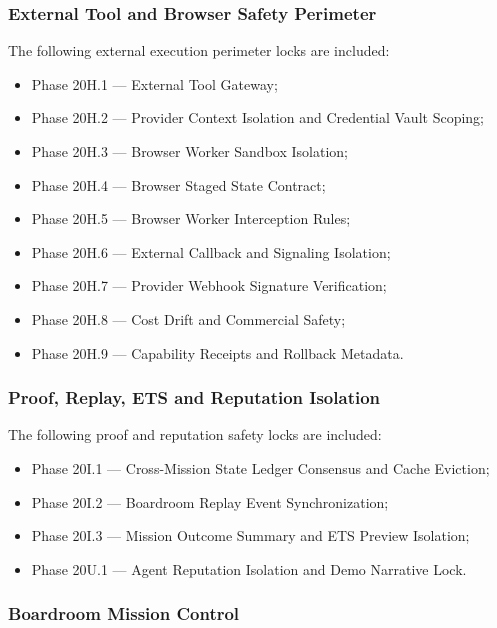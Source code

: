 \subsubsection{External Tool and Browser Safety Perimeter}

The following external execution perimeter locks are included:

\begin{itemize}
  \item Phase 20H.1 --- External Tool Gateway;
  \item Phase 20H.2 --- Provider Context Isolation and Credential Vault Scoping;
  \item Phase 20H.3 --- Browser Worker Sandbox Isolation;
  \item Phase 20H.4 --- Browser Staged State Contract;
  \item Phase 20H.5 --- Browser Worker Interception Rules;
  \item Phase 20H.6 --- External Callback and Signaling Isolation;
  \item Phase 20H.7 --- Provider Webhook Signature Verification;
  \item Phase 20H.8 --- Cost Drift and Commercial Safety;
  \item Phase 20H.9 --- Capability Receipts and Rollback Metadata.
\end{itemize}

\subsubsection{Proof, Replay, ETS and Reputation Isolation}

The following proof and reputation safety locks are included:

\begin{itemize}
  \item Phase 20I.1 --- Cross-Mission State Ledger Consensus and Cache Eviction;
  \item Phase 20I.2 --- Boardroom Replay Event Synchronization;
  \item Phase 20I.3 --- Mission Outcome Summary and ETS Preview Isolation;
  \item Phase 20U.1 --- Agent Reputation Isolation and Demo Narrative Lock.
\end{itemize}

\subsubsection{Boardroom Mission Control}

